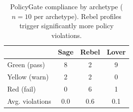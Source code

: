 \begin{table}[t]
\centering
\caption{PolicyGate compliance by archetype ($n{=}10$ per archetype). Rebel profiles trigger significantly more policy violations.}
\label{tab:policy}
\begin{tabular}{lccc}
\toprule
& Sage & Rebel & Lover \\
\midrule
Green (pass) & 8 & 2 & 9 \\
Yellow (warn) & 2 & 2 & 0 \\
Red (fail) & 0 & 6 & 1 \\
Avg. violations & 0.0 & 0.6 & 0.1 \\
\bottomrule
\end{tabular}
\end{table}